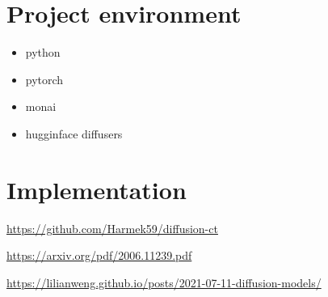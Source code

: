 \documentclass[11pt,a4paper]{report}
\begin{document}
\section{Project environment} %
\begin{itemize}
\item python 
\item pytorch
\item monai
\item hugginface diffusers 
\end{itemize}
\section{Implementation}
\url{https://github.com/Harmek59/diffusion-ct}


\begin{thebibliography}{99}

\url{https://arxiv.org/pdf/2006.11239.pdf}

\url{ https://lilianweng.github.io/posts/2021-07-11-diffusion-models/}
  
  
  
\end{thebibliography}
\end{document}
